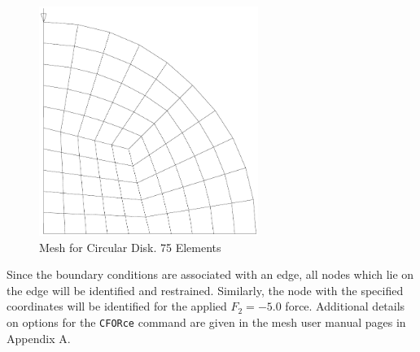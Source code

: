 \begin{figure}[ht!]
\centerline {\hfil \includegraphics[width=2.8in]{figs/fig4} \hfil}
\caption{Mesh for Circular Disk. 75 Elements}
\label{fig7}
\end{figure}

Since the boundary conditions are associated with an edge, all nodes
which lie on the edge will be identified and restrained.  Similarly,
the node with the specified coordinates will be identified for the
applied $F_2 = -5.0$ force.
Additional details on options for the {\tt CFORce} command are given in the
mesh user manual pages in Appendix A.

